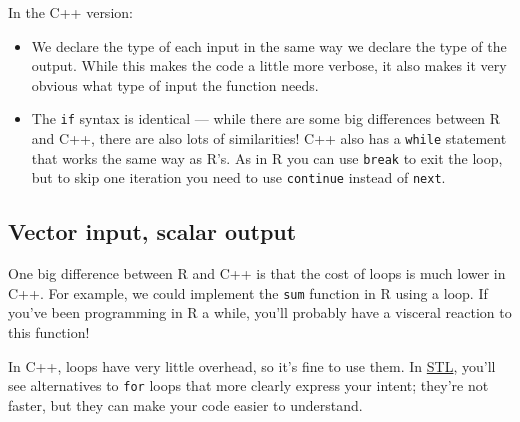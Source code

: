 In the C++ version:

\begin{itemize}
\item
  We declare the type of each input in the same way we declare the type
  of the output. While this makes the code a little more verbose, it
  also makes it very obvious what type of input the function needs.
\item
  The \texttt{if} syntax is identical --- while there are some big
  differences between R and C++, there are also lots of similarities!
  C++ also has a \texttt{while} statement that works the same way as
  R's. As in R you can use \texttt{break} to exit the loop, but to skip
  one iteration you need to use \texttt{continue} instead of
  \texttt{next}.
\end{itemize}

\hypertarget{vector-input-scalar-output}{%
\subsection{Vector input, scalar
output}\label{vector-input-scalar-output}}

One big difference between R and C++ is that the cost of loops is much
lower in C++. For example, we could implement the \texttt{sum} function
in R using a loop. If you've been programming in R a while, you'll
probably have a visceral reaction to this function!

\begin{Shaded}
\begin{Highlighting}[]
\StringTok{ }
\StringTok{ }
   
\StringTok{ }\OperatorTok{+}\StringTok{ }
\NormalTok{  \}}
\NormalTok{\}}
\end{Highlighting}
\end{Shaded}

In C++, loops have very little overhead, so it's fine to use them. In
\protect\hyperlink{stl}{STL}, you'll see alternatives to \texttt{for}
loops that more clearly express your intent; they're not faster, but
they can make your code easier to understand.

\begin{Shaded}
\begin{Highlighting}[]
\NormalTok{(}
\StringTok{  \}}
\NormalTok{)}
\end{Highlighting}
\end{Shaded}

